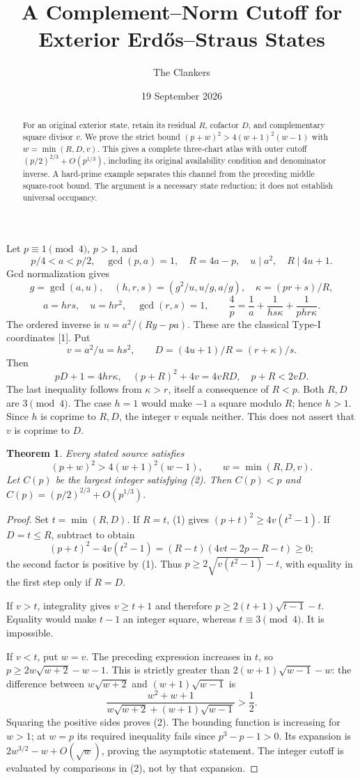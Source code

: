 \documentclass[11pt,reqno]{amsart}
\title{A Complement--Norm Cutoff for Exterior Erd\H{o}s--Straus States}
\author{The Clankers}\date{19 September 2026}
\newtheorem{theorem}{Theorem}\newtheorem{corollary}[theorem]{Corollary}
\begin{document}
\begin{abstract}
For an original exterior state, retain its residual $R$, cofactor $D$, and
complementary square divisor $v$. We prove the strict bound
$(p+w)^2>4(w+1)^2(w-1)$ with $w=\min(R,D,v)$. This gives a complete three-chart
atlas with outer cutoff $(p/2)^{2/3}+O(p^{1/3})$, including its original
availability condition and denominator inverse. A hard-prime example separates
this channel from the preceding middle square-root bound. The argument is a
necessary state reduction; it does not establish universal occupancy.
\end{abstract}\maketitle

Let $p\equiv1\pmod4$, $p>1$, and
\[
 p/4<a<p/2,\quad\gcd(p,a)=1,\quad R=4a-p,\quad
 u\mid a^2,\quad R\mid4u+1.
\]
Gcd normalization gives
\[
 g=\gcd(a,u),\quad(h,r,s)=(g^2/u,u/g,a/g),\quad
 \kappa=(pr+s)/R,
\]
\[
 a=hrs,\quad u=hr^2,\quad \gcd(r,s)=1,\qquad
 \frac4p=\frac1a+\frac1{hs\kappa}+\frac1{phr\kappa}.
\]
The ordered inverse is $u=a^2/(Ry-pa)$. These are the classical Type-I
coordinates [1]. Put
\[
 v=a^2/u=hs^2,\qquad
 D=(4u+1)/R=(r+\kappa)/s.
\]
Then
\[
 pD+1=4hr\kappa,\quad (p+R)^2+4v=4vRD,\quad p+R<2vD.       \tag{1}
\]
The last inequality follows from $\kappa>r$, itself a consequence of $R<p$.
Both $R,D$ are $3\pmod4$. The case $h=1$ would make $-1$ a square modulo $R$;
hence $h>1$. Since $h$ is coprime to $R,D$, the integer $v$ equals neither.
This does not assert that $v$ is coprime to $D$.

\begin{theorem}
Every stated source satisfies
\[
 \boxed{(p+w)^2>4(w+1)^2(w-1),\qquad w=\min(R,D,v).}         \tag{2}
\]
Let $C(p)$ be the largest integer satisfying (2). Then $C(p)<p$ and
$C(p)=(p/2)^{2/3}+O(p^{1/3})$.
\end{theorem}
\begin{proof}
Set $t=\min(R,D)$. If $R=t$, (1) gives
$(p+t)^2\ge4v(t^2-1)$. If $D=t\le R$, subtract to obtain
\[
 (p+t)^2-4v(t^2-1)=(R-t)(4vt-2p-R-t)\ge0;
\]
the second factor is positive by (1). Thus
$p\ge2\sqrt{v(t^2-1)}-t$, with equality in the first step only if $R=D$.

If $v>t$, integrality gives $v\ge t+1$ and therefore
$p\ge2(t+1)\sqrt{t-1}-t$. Equality would make $t-1$ an integer square,
whereas $t\equiv3\pmod4$. It is impossible.

If $v<t$, put $w=v$. The preceding expression increases in $t$, so
$p\ge2w\sqrt{w+2}-w-1$. This is strictly greater than
$2(w+1)\sqrt{w-1}-w$: the difference between
$w\sqrt{w+2}$ and $(w+1)\sqrt{w-1}$ is
\[
 \frac{w^2+w+1}{w\sqrt{w+2}+(w+1)\sqrt{w-1}}>\frac12.
\]
Squaring the positive sides proves (2). The bounding function is increasing
for $w>1$; at $w=p$ its required inequality fails since $p^3-p-1>0$.
Its expansion is $2w^{3/2}-w+O(\sqrt w)$, proving the asymptotic statement.
The integer cutoff is evaluated by comparisons in (2), not by that expansion.
\end{proof}
\end{document}
